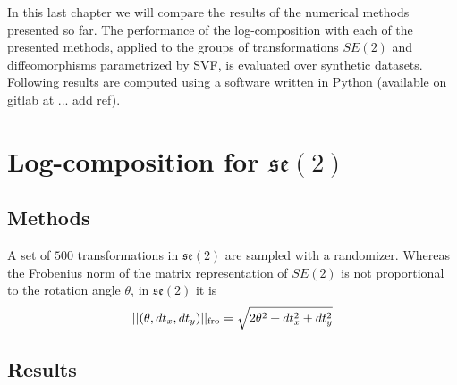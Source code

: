 In this last chapter we will compare the results of the numerical methods presented so far.
The performance of the log-composition with each of the presented methods, applied to the groups of transformations $SE(2)$ and diffeomorphisms parametrized by SVF, is evaluated over synthetic datasets.\\
Following results are computed using a software written in Python (available on gitlab at ... add ref).

\section{Log-composition for $\mathfrak{se}(2)$}



\subsection{Methods}

A set of $500$ transformations in $\mathfrak{se}(2)$ are sampled with a randomizer. Whereas the Frobenius norm of the matrix representation of $SE(2)$ is not proportional to the rotation angle $\theta$, in $\mathfrak{se}(2)$ it is
\begin{align*}
\vert\lvert (\theta,dt_{x},dt_{y}) \rvert\vert_{\text{fro}} = \sqrt{2\theta^{2} + dt_{x}^2 + dt_{y}^2} 
\end{align*}




\subsection{Results}


